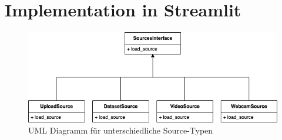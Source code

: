 \documentclass{article}
\begin{document}
\newpage

\section{Implementation in Streamlit}





\newpage
\begin{figure}
	\centering
	\includegraphics[scale=0.5]{input_sources.png}
	\caption{UML Diagramm für unterschiedliche Source-Typen}
\end{figure}






\end{document}
